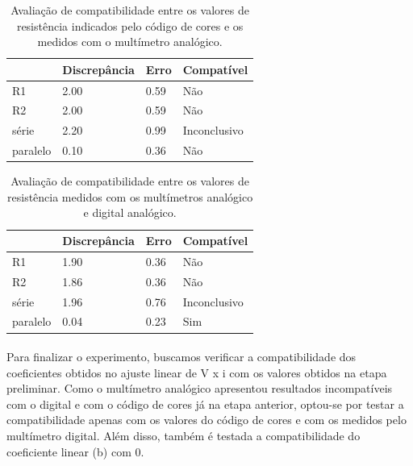 \documentclass[11pt,a4paper]{article}
\begin{document}
        
       \begin{table}[htb!]
        \centering
        \begin{tabular}{llll}
        \toprule
                   & Discrepância      & Erro & Compatível                          \\
          \midrule
          R1       & 2.00              & 0.59 & {\color[HTML]{CB0000} Não}          \\
          R2       & 2.00              & 0.59 & {\color[HTML]{CB0000} Não}          \\
          série    & 2.20              & 0.99 & {\color[HTML]{646809} Inconclusivo} \\
          paralelo & 0.10              & 0.36 & {\color[HTML]{CB0000} Não}          \\
          \bottomrule
          
          \end{tabular}
        \caption{Avaliação de compatibilidade entre os valores de resistência indicados pelo código de cores e os medidos com o multímetro analógico.}
        \label{tab:compatccanalog}
        \end{table}
        
               \begin{table}[htb!]
        \centering
        \begin{tabular}{llll}
        \toprule
                   & Discrepância      & Erro & Compatível                          \\
          \midrule
          R1       & 1.90              & 0.36 & {\color[HTML]{CB0000} Não}          \\
          R2       & 1.86              & 0.36 & {\color[HTML]{CB0000} Não}          \\
          série    & 1.96              & 0.76 & {\color[HTML]{646809} Inconclusivo} \\
          paralelo & 0.04              & 0.23 & {\color[HTML]{009901} Sim}          \\ 
          \bottomrule
          
          \end{tabular}
        \caption{Avaliação de compatibilidade entre os valores de resistência medidos com os multímetros analógico e digital analógico.}
        \label{tab:compatdiganalog}
        \end{table}
        
      \paragraph{}
      Para finalizar o experimento, buscamos verificar a compatibilidade dos coeficientes obtidos no ajuste linear de V x i com os valores obtidos na etapa preliminar. Como o multímetro analógico apresentou resultados incompatíveis com o digital e com o código de cores já na etapa anterior, optou-se por testar a compatibilidade apenas com os valores do código de cores e com os medidos pelo multímetro digital. Além disso, também é testada a compatibilidade do coeficiente linear (b) com 0. 
\end{document}

